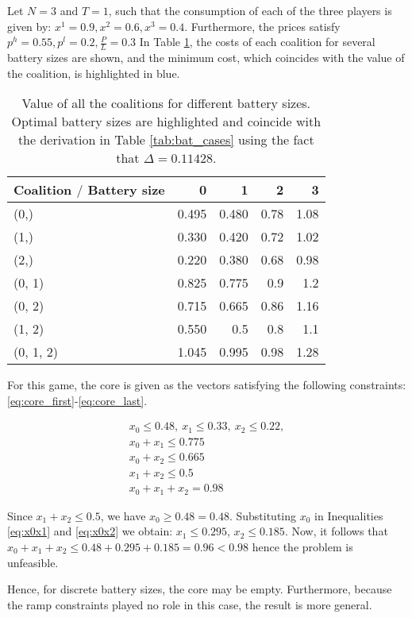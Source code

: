 \documentclass[sigconf, table]{acmart}
\newcommand{\pricelow}{p^l}
\newcommand{\pricehigh}{p^h}
\begin{document}
\begin{example}\label{ex:emptycore}

Let $N = 3$ and $T=1$, such that the consumption of each of the three players is given by: $x^1 = 0.9, x^2 = 0.6, x^3 = 0.4$. Furthermore, the prices satisfy $\pricehigh = 0.55, \pricelow = 0.2, \frac{P}{L} = 0.3$
In Table \ref{tab:cost_coalitions}, the costs of each coalition for several battery sizes are shown, and the minimum cost, which coincides with the value of the coalition, is highlighted in blue. 


\begin{table}[htpb]
	\centering
	\caption{Value of all the coalitions for different battery sizes. Optimal battery sizes are highlighted and coincide with the derivation in Table \ref{tab:bat_cases} using the fact that $\Delta = 0.11428$.}
	\label{tab:cost_coalitions}
	\begin{tabular}{lrrrr}
\toprule
Coalition $\slash$ Battery size &      0 &      1 &     2 &     3  \\
\midrule
(0,)      &  0.495 & \cellcolor{blue!25} 0.480 &  0.78 &  1.08 \\
(1,)      &  \cellcolor{blue!25} 0.330 &  0.420 &  0.72 &  1.02\\
(2,)      &  \cellcolor{blue!25} 0.220 &  0.380 &  0.68 &  0.98\\
(0, 1)    &  0.825 &  \cellcolor{blue!25} 0.775 &  0.9 &  1.2 \\
(0, 2)    &  0.715 &  \cellcolor{blue!25} 0.665 &  0.86 &  1.16\\
(1, 2)    &  0.550 &  \cellcolor{blue!25} 0.5 &  0.8 &  1.1 \\
(0, 1, 2) &  1.045 &  0.995 &  \cellcolor{blue!25} 0.98 &  1.28\\
\bottomrule
\end{tabular}
\end{table}

For this game, the core is given as the vectors satisfying the following constraints: \eqref{eq:core_first}-\eqref{eq:core_last}.

\begin{gather}
x_0 \leq 0.48, \  x_1 \leq 0.33, \ x_2 \leq 0.22, \label{eq:core_first}\\
x_0 + x_1 \leq 0.775 \label{eq:x0x1}\\
x_0 + x_2 \leq 0.665 \label{eq:x0x2}\\
x_1 + x_2 \leq 0.5 \\
x_0 + x_1 + x_2 = 0.98 \label{eq:core_last}
\end{gather}


Since $x_1 + x_2 \leq 0.5$, we have $x_0 \geq 0.48 = 0.48$. Substituting $x_0$ in Inequalities \eqref{eq:x0x1} and \eqref{eq:x0x2} we obtain: $x_1 \leq  0.295$, $x_2 \leq 0.185$. Now, it follows that $x_0 + x_1 + x_2 \leq 0.48 + 0.295 + 0.185 = 0.96 < 0.98$ hence the problem is unfeasible.

Hence, for discrete battery sizes, the core may be empty. Furthermore, because the ramp constraints played no role in this case, the result is more general.
\end{example}
\end{document}
